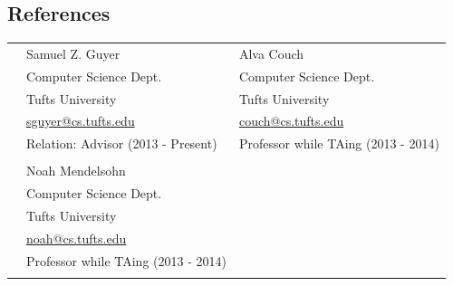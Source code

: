 \documentclass[margin,line]{res}                          %
\begin{document}
\begin{resume}
\section{\sc References}
\vspace{.05in}
\begin{tabular}{@{}p{0.20in}p{2.5in}p{3in}}
& Samuel Z. Guyer                      & Alva Couch \\
& Computer Science Dept.               & Computer Science Dept. \\
& Tufts University                     & Tufts University \\
& \href{mailto:sguyer@cs.tufts.edu}{sguyer@cs.tufts.edu} & \href{mailto:couch@cs.tufts.edu}{couch@cs.tufts.edu} \\
& Relation: Advisor (2013 - Present)   & Professor while TAing (2013 - 2014) \\
&                                      & \\
& Noah Mendelsohn                      & \\
& Computer Science Dept.               & \\
& Tufts University                     & \\
& \href{mailto:noah@cs.tufts.edu}{noah@cs.tufts.edu} & \\
& Professor while TAing (2013 - 2014) & \\
&                                      & \\
\end{tabular}

\end{resume}
\end{document}
